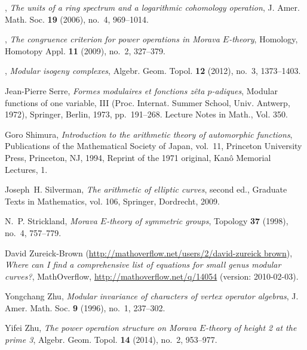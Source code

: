 \documentclass{gtpart}
\theoremstyle{definition}
\theoremstyle{remark}
\renewcommand{\=}{\approx}
\renewcommand{\-}{\sim}
\numberwithin{equation}{section}
\numberwithin{thm}{section}
\begin{document}
\begin{thebibliography}
\bysame, \emph{The units of a ring spectrum and a logarithmic cohomology
  operation}, J. Amer. Math. Soc. \textbf{19} (2006), no.~4, 969--1014.

\bysame, \emph{The congruence criterion for power operations in {M}orava
  {$E$}-theory}, Homology, Homotopy Appl. \textbf{11} (2009), no.~2, 327--379.

\bysame, \emph{Modular isogeny complexes}, Algebr. Geom. Topol. \textbf{12}
  (2012), no.~3, 1373--1403. 

Jean-Pierre Serre, \emph{Formes modulaires et fonctions z\^eta {$p$}-adiques},
  Modular functions of one variable, {III} ({P}roc. {I}nternat. {S}ummer
  {S}chool, {U}niv. {A}ntwerp, 1972), Springer, Berlin, 1973, pp.~191--268.
  Lecture Notes in Math., Vol. 350. 

Goro Shimura, \emph{Introduction to the arithmetic theory of automorphic
  functions}, Publications of the Mathematical Society of Japan, vol.~11,
  Princeton University Press, Princeton, NJ, 1994, Reprint of the 1971
  original, Kan{\^o} Memorial Lectures, 1. 

Joseph~H. Silverman, \emph{The arithmetic of elliptic curves}, second ed.,
  Graduate Texts in Mathematics, vol. 106, Springer, Dordrecht, 2009.

N.~P. Strickland, \emph{Morava {$E$}-theory of symmetric groups}, Topology
  \textbf{37} (1998), no.~4, 757--779. 

David Zureick-Brown (\href{http://mathoverflow.net/users/2/david-zureick brown}{http://mathoverflow.net/users/2/david-zureick brown}),
  \emph{Where can {I} find a comprehensive list of equations for small genus
  modular curves?}, MathOverflow, \href{http://mathoverflow.net/q/14054}{http://mathoverflow.net/q/14054} (version:
  2010-02-03).

Yongchang Zhu, \emph{Modular invariance of characters of vertex operator
  algebras}, J. Amer. Math. Soc. \textbf{9} (1996), no.~1, 237--302.

Yifei Zhu, \emph{The power operation structure on {M}orava {$E$}-theory of
  height 2 at the prime 3}, Algebr. Geom. Topol. \textbf{14} (2014), no.~2,
  953--977. 

\end{thebibliography}
\end{document}
